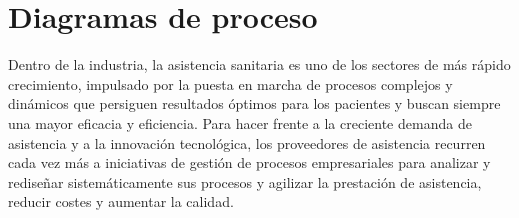 

\section{Diagramas de proceso}

Dentro de la industria, la asistencia sanitaria es uno de los sectores de más rápido crecimiento, impulsado por la puesta en marcha de procesos complejos y dinámicos que persiguen resultados óptimos para los pacientes y buscan siempre una mayor eficacia y eficiencia.
Para hacer frente a la creciente demanda de asistencia y a la innovación tecnológica, los proveedores de asistencia recurren cada vez más a iniciativas de gestión de procesos empresariales para analizar y rediseñar sistemáticamente sus procesos y agilizar la prestación de asistencia, reducir costes y aumentar la calidad.


